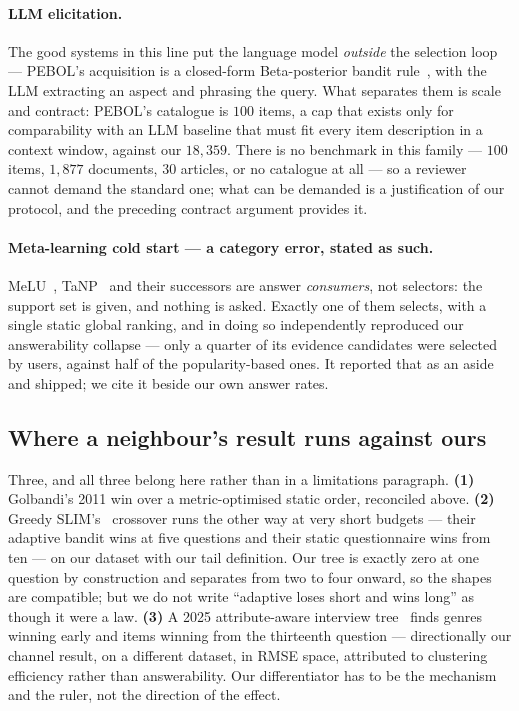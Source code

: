 \documentclass[11pt]{article}
\begin{document}
\paragraph{LLM elicitation.} The good systems in this line put the language model \emph{outside} the
selection loop --- PEBOL's acquisition is a closed-form Beta-posterior bandit
rule~\cite{austin2024bayesian}, with the LLM extracting an aspect and phrasing the query. What
separates them is scale and contract: PEBOL's catalogue is $100$ items, a cap that exists only for
comparability with an LLM baseline that must fit every item description in a context window, against
our $18{,}359$. There is no benchmark in this family --- $100$ items, $1{,}877$ documents, $30$
articles, or no catalogue at all --- so a reviewer cannot demand the standard one; what can be
demanded is a justification of our protocol, and the preceding contract argument provides it.

\paragraph{Meta-learning cold start --- a category error, stated as such.} MeLU~\cite{lee2019melu},
TaNP~\cite{lin2021tanp} and their successors are answer \emph{consumers}, not selectors: the support
set is given, and nothing is asked. Exactly one of them selects, with a single static global ranking,
and in doing so independently reproduced our answerability collapse --- only a quarter of its
evidence candidates were selected by users, against half of the popularity-based ones. It reported
that as an aside and shipped; we cite it beside our own answer rates.

\subsection{Where a neighbour's result runs against ours}

Three, and all three belong here rather than in a limitations paragraph. \textbf{(1)} Golbandi's 2011
win over a metric-optimised static order, reconciled above. \textbf{(2)} Greedy
SLIM's~\cite{proissl2024greedyslim} crossover runs the other way at very short budgets --- their
adaptive bandit wins at five questions and their static questionnaire wins from ten --- on our
dataset with our tail definition. Our tree is exactly zero at one question by construction and
separates from two to four onward, so the shapes are compatible; but we do not write ``adaptive loses
short and wins long'' as though it were a law. \textbf{(3)} A 2025 attribute-aware interview
tree~\cite{gharahighehi2025pairwise} finds genres winning early and items winning from the thirteenth
question --- directionally our channel result, on a different dataset, in RMSE space, attributed to
clustering efficiency rather than answerability. Our differentiator has to be the mechanism and the
ruler, not the direction of the effect.
\end{document}
